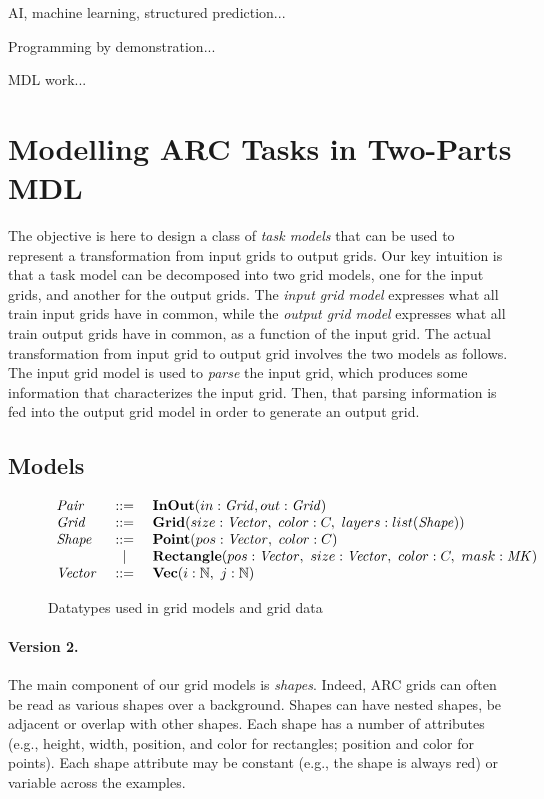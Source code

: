 \documentclass[a4paper]{llncs}
\newenvironment{datatype}{$\begin{array}{lcl}}{\end{array}$}
\newcommand{\is}{&\ ::=\ &}
\newcommand{\altis}{\\ &\ \mid\ &}
\newcommand{\nat}{\mathbb{N}}
\begin{document}
AI, machine learning, structured prediction...

Programming by demonstration...

MDL work...



\section{Modelling ARC Tasks in Two-Parts MDL}
\label{modelling}

The objective is here to design a class of {\em task models} that can
be used to represent a transformation from input grids to output
grids.
%
Our key intuition is that a task model can be decomposed into two grid
models, one for the input grids, and another for the output grids. The
{\em input grid model} expresses what all train input grids have in
common, while the {\em output grid model} expresses what all train
output grids have in common, as a function of the input grid.
%
The actual transformation from input grid to output grid involves the
two models as follows. The input grid model is used to {\em parse} the
input grid, which produces some information that characterizes the
input grid. Then, that parsing information is fed into the output grid
model in order to generate an output grid.

\subsection{Models}
\label{model}

\begin{figure}[t]
\begin{center}
\begin{datatype}
  {\it Pair} \is {\bf InOut}(in: {\it Grid}, out: {\it Grid})
  \\
  {\it Grid} \is {\bf Grid}(size: {\it Vector},\ color: C,\ layers: list({\it Shape}))
  \\
  {\it Shape} \is {\bf Point}(pos: {\it Vector},\ color: C)
  \altis {\bf Rectangle}(pos: {\it Vector},\ size: {\it Vector},\ color: C,\ mask: {\it MK})
  \\
  {\it Vector} \is {\bf Vec}(i: \nat,\ j: \nat)
\end{datatype}
\end{center}
\caption{Datatypes used in grid models and grid data}
\label{fig:patterns}
\end{figure}

\paragraph{Version 2.}
The main component of our grid models is {\em shapes}. Indeed, ARC
grids can often be read as various shapes over a background. Shapes
can have nested shapes, be adjacent or overlap with other shapes. Each
shape has a number of attributes (e.g., height, width, position, and
color for rectangles; position and color for points). Each shape
attribute may be constant (e.g., the shape is always red) or variable
across the examples.
\end{document}

